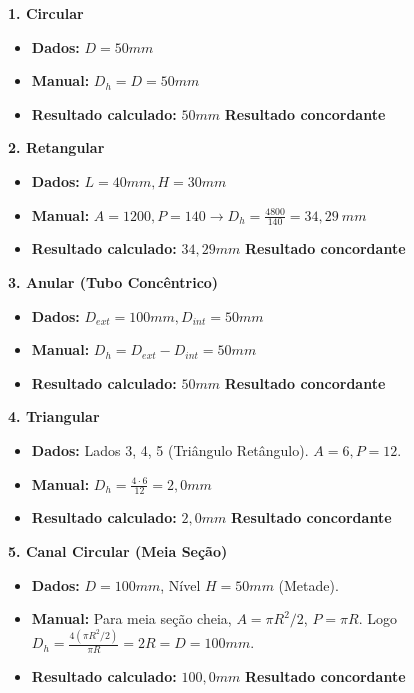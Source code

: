 \par\medskip
\noindent\textbf{1. Circular}
\begin{itemize}
    \item \textbf{Dados:} $D=50mm$
    \item \textbf{Manual:} $D_h = D = 50mm$
    \item \textbf{Resultado calculado:} $50mm$ \textbf{Resultado concordante}
\end{itemize}

\par\medskip
\noindent\textbf{2. Retangular}
\begin{itemize}
    \item \textbf{Dados:} $L=40mm, H=30mm$
    \item \textbf{Manual:} $A=1200, P=140 \rightarrow D_h = \frac{4800}{140} = 34,29 \ mm$
    \item \textbf{Resultado calculado:} $34,29mm$ \textbf{Resultado concordante}
\end{itemize}

\par\medskip
\noindent\textbf{3. Anular (Tubo Concêntrico)}
\begin{itemize}
    \item \textbf{Dados:} $D_{ext}=100mm, D_{int}=50mm$
    \item \textbf{Manual:} $D_h = D_{ext} - D_{int} = 50mm$
    \item \textbf{Resultado calculado:} $50mm$ \textbf{Resultado concordante}
\end{itemize}

\par\medskip
\noindent\textbf{4. Triangular}
\begin{itemize}
    \item \textbf{Dados:} Lados 3, 4, 5 (Triângulo Retângulo). $A=6, P=12$.
    \item \textbf{Manual:} $D_h = \frac{4 \cdot 6}{12} = 2,0mm$
    \item \textbf{Resultado calculado:} $2,0mm$ \textbf{Resultado concordante}
\end{itemize}

\par\medskip
\noindent\textbf{5. Canal Circular (Meia Seção)}
\begin{itemize}
    \item \textbf{Dados:} $D=100mm$, Nível $H=50mm$ (Metade).
    \item \textbf{Manual:} Para meia seção cheia, $A = \pi R^2 / 2$, $P = \pi R$. Logo $D_h = \frac{4 (\pi R^2/2)}{\pi R} = 2R = D = 100mm$.
    \item \textbf{Resultado calculado:} $100,0mm$ \textbf{Resultado concordante}
\end{itemize}

